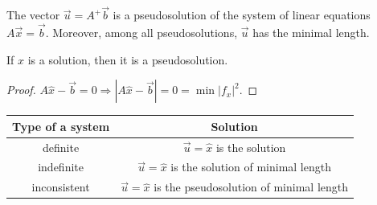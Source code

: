     \begin{theorema}{}{}
        The vector $\vec{u} = A^+\vec{b}$ is a pseudosolution of the system of linear equations $A\vec{x} = \vec{b}$. Moreover, among all pseudosolutions, $\vec{u}$ has the minimal length.
    \end{theorema}
    \begin{proposition}{}{}
        If $\hat{x}$ is a solution, then it is a pseudosolution.
    \end{proposition}
    \begin{proof}
        $A\hat{x} - \vec{b} = 0 \Longrightarrow \left| A\hat{x} - \vec{b} \right| = 0 = \min |f_x|^2.$
    \end{proof}
    \vspace*{0.2cm}

    \Ex 
    \begin{center}
        \begin{tabular}{|c|c|}
            \hline
            Type of a system & Solution \\ \hline
            definite         &      $\vec{u} = \hat{x}$  is the solution  \\ \hline
            indefinite       &   $\vec{u} = \hat{x}$  is the solution of minimal length       \\ \hline
            inconsistent     &    $\vec{u} = \hat{x}$  is the pseudosolution  of minimal length    \\ \hline
            \end{tabular}
    \end{center}

